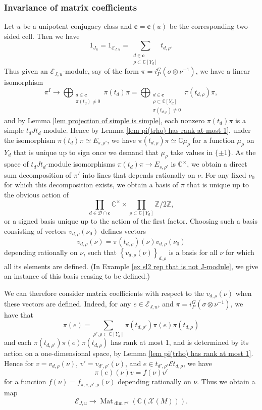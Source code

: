 \documentclass[10pt]{article}
\newcommand{\sett}[1]{\left\{#1\right\}}
\DeclareMathOperator{\Mat}{Mat}
\newcommand{\X}{\mathcal{X}}
\newcommand{\Ee}{\mathcal{E}}
\newcommand{\Z}{\mathbb{Z}}
\newcommand{\C}{\mathbb{C}}
\newcommand{\cc}{\mathbf{c}}
\theoremstyle{definition}
\theoremstyle{remark}
\begin{document}
\subsubsection{Invariance of matrix coefficients}
%
Let $u$ be a unipotent conjugacy class and $\cc=\cc(u)$ be the corresponding two-sided cell. Then we have
%
\[
1_{J_u}=1_{\mathcal{E}_{J,u}}=\sum_{\substack{d\in\cc \\ \rho\subset\C[Y_d]}}t_{d,\rho}.
\]
%
Thus given an $\Ee_{J,u}$-module, say of the form $\pi=i_P^G(\sigma\otimes\nu^{-1})$,
we have a linear isomorphism
%
\begin{equation}
\label{eqn pi(trho) define rational basis}
\pi^I\to\bigoplus_{\substack{d\in\cc \\ \pi(t_d)\neq 0}}\pi(t_{d})\pi=
\bigoplus_{\substack{d\in\cc \\ \rho\subset\C[Y_d] \\ \pi(t_{d,\rho})\neq 0}}\pi(t_{d,\rho})\pi,
\end{equation}
%
and by Lemma \ref{lem projection of simple is simple}, each nonzero $\pi(t_d)\pi$ is a simple $t_dJt_d$-module. Hence by Lemma \ref{lem pi(trho) has rank at most 1}, under the isomorphism
$\pi(t_d)\pi\simeq E_{s,\rho'}$, we have $\pi(t_{d,\rho})\pi\simeq\C\mu_\rho$ for a function $\mu_\rho$
on $Y_d$ that is unique up to sign once we demand that $\mu_\rho$ take values in $\{\pm 1\}$. As the space of $t_dJt_d$-module isomorphisms $\pi(t_d)\pi\to E_{s,\rho'}$ is $\C^\times$, we obtain a direct sum decomposition of $\pi^I$ into
lines that depends rationally on $\nu$. For any fixed $\nu_0$ for which this
decomposition exists,  we obtain a basis 
of $\pi$ that is unique up to the obvious action of 
%
\[
\prod_{d\in\mathcal{D}\cap\cc}\C^\times\times\prod_{\rho\subset\C[Y_d]}\Z/2\Z,
\]
%
or a signed basis unique up to the action of the first factor. Choosing such 
a basis consisting of vectors $v_{d,\rho}(\nu_0)$ defines vectors
%
\[
v_{d,\rho}(\nu)=\pi(t_{d,\rho})(\nu)v_{d,\rho}(\nu_0)
\]
%
depending rationally on $\nu$, such that $\sett{v_{d,\rho}(\nu)}_{d,\rho}$ is 
a basis for all $\nu$ for which all its elements are defined. (In Example
\ref{ex sl2 rep that is not J-module}, we give an instance of this basis
ceasing to be defined.)

We can therefore consider matrix coefficients with respect to the 
$v_{d,\rho}(\nu)$ when these vectors are defined.
Indeed, for any $e\in\mathcal{E}_{J,u}$, and $\pi=i_P^G(\sigma\otimes\nu^{-1})$, we have that 
%
\[
\pi(e)=\sum_{\rho',\rho\subset\C[Y_d]}\pi(t_{d,\rho'})\pi(e)\pi(t_{d,\rho})
\]
%
and each $\pi(t_{d,\rho'})\pi(e)\pi(t_{d,\rho})$ has rank at most 1, and is 
determined by its action on a one-dimensional space, by Lemma \ref{lem pi(trho) has rank at most 1}. Hence for $v=v_{d,\rho}(\nu)$, $v'=v_{d',\rho'}(\nu)$, and $e\in t_{d',\rho'}\mathcal{E}t_{d,\rho}$, we have
%
\begin{equation}
\label{eqn definition of matrix coeffs}
\pi(e)(\nu)v=f(\nu)v'
\end{equation}
%
for a function $f(\nu)=f_{\pi,e,\rho',\rho}(\nu)$ depending rationally on $\nu$. Thus we obtain a map
%
\[
\mathcal{E}_{J,u}\to\Mat_{\dim\pi^I}(\C(\X(M))).
\]
%
\end{document}
